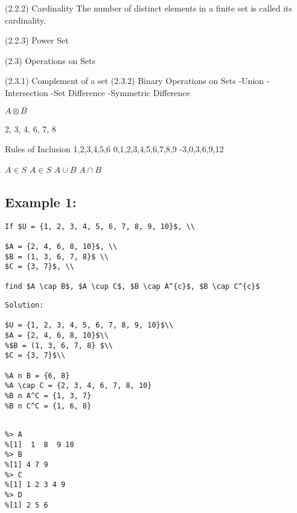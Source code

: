 (2.2.2) Cardinality 
The number of distinct elements in a finite set is called its cardinality.


(2.2.3) Power Set

(2.3) Operations on Sets

(2.3.1) Complement of a set
(2.3.2) Binary Operations on Sets
-Union
-Intersection
-Set Difference
-Symmetric Difference 


$ A \otimes B$

{2, 3, 4, 6, 7, 8}

Rules of Inclusion
{1,2,3,4,5,6}
{0,1,2,3,4,5,6,7,8,9}
{-3,0,3,6,9,12}

$ A \in S$
$ A \in S$
$ A \cup B$
$ A \cap B$
\subsection*{Example 1: }
\begin{verbatim}
If $U = {1, 2, 3, 4, 5, 6, 7, 8, 9, 10}$, \\

$A = {2, 4, 6, 8, 10}$, \\
$B = (1, 3, 6, 7, 8}$ \\
$C = {3, 7}$, \\

find $A \cap B$, $A \cup C$, $B \cap A^{c}$, $B \cap C^{c}$
\end{verbatim}
\begin{verbatim}
Solution: 

$U = {1, 2, 3, 4, 5, 6, 7, 8, 9, 10}$\\
$A = {2, 4, 6, 8, 10}$\\
%$B = (1, 3, 6, 7, 8} $\\
$C = {3, 7}$\\

%A n B = {6, 8}
%A \cap C = {2, 3, 4, 6, 7, 8, 10}
%B n A^C = {1, 3, 7}
%B n C^C = {1, 6, 8}
\end{verbatim}
\begin{verbatim}

%> A
%[1]  1  8  9 10
%> B
%[1] 4 7 9
%> C
%[1] 1 2 3 4 9
%> D
%[1] 2 5 6
\end{verbatim}












